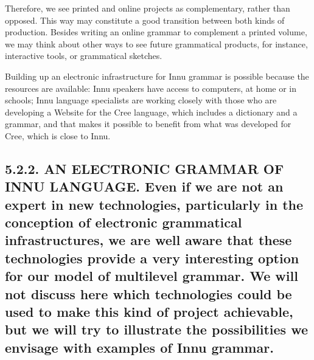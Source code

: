 \documentclass[letterpaper]{article}
\begin{document}
Therefore, we see printed and online projects as complementary, rather than opposed. This way may constitute a good transition between both kinds of production. Besides writing an online grammar to complement a printed volume, we may think about other ways to see future grammatical products, for instance, interactive tools, or grammatical sketches.

Building up an electronic infrastructure for Innu grammar is possible because the resources are available: Innu speakers have access to computers, at home or in schools; Innu language specialists are working closely with those who are developing a Website for the Cree language, which includes a dictionary and a grammar, and that makes it possible to benefit from what was developed for Cree, which is close to Innu.

\subsection[5.2.2. AN ELECTRONIC GRAMMAR OF INNU LANGUAGE. Even if we are not an expert in new technologies, particularly in the conception of electronic grammatical infrastructures, we are well aware that these technologies provide a very interesting option for our model of multilevel grammar. We will not discuss here which technologies could be used to make this kind of project achievable, but we will try to illustrate the possibilities we envisage with examples of Innu grammar.]{5.2.2. AN ELECTRONIC GRAMMAR OF INNU LANGUAGE. \textmd{Even if we are not an expert in new technologies, particularly in the conception of electronic grammatical infrastructures, we are well aware that these technologies provide a }\textmd{very }\textmd{interesting option for our model of multilevel grammar. }\textmd{W}\textmd{e will }\textmd{not }\textmd{discuss here wh}\textmd{ich}\textmd{ }\textmd{technologies }\textmd{could be }\textmd{used to make th}\textmd{is}\textmd{ kind of project}\textmd{ }\textmd{achievable}\textmd{, but}\textmd{ }\textmd{we will }\textmd{try to illustrate }\textmd{the }\textmd{possibilities }\textmd{we }\textmd{envis}\textmd{age}\textmd{ }\textmd{with examples of Innu grammar.}}
\end{document}

